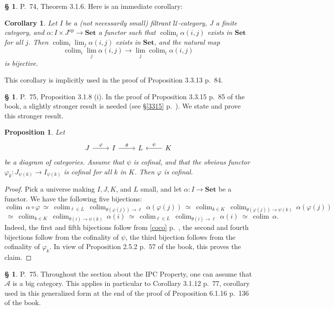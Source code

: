 \documentclass[12pt]{article}
\newtheorem{prop}[thm]{Proposition}
\newtheorem{cor}[thm]{Corollary}
\theoremstyle{remark}
\theoremstyle{definition}
\newtheorem{s}[thm]{\S}
\newcommand{\A}{\mathcal A}
\newcommand{\U}{\mathcal U}
\newcommand{\Set}{\mathbf{Set}}
\newcommand{\pp}{\varphi}
\DeclareMathOperator*{\colim}{colim}
\DeclareMathOperator{\op}{op}
\begin{document}
%

\begin{s} 
P.~74, Theorem 3.1.6. Here is an immediate corollary: 
%
\begin{cor}\label{316}
Let $I$ be a (not necessarily small) filtrant $\U$-category, $J$ a finite category, and $\alpha:I\times J^{\op}\to\Set$ a functor such that $\colim_i\alpha(i,j)$ exists in $\Set$ for all $j$. Then $\colim_i\lim_j\alpha(i,j)$ exists in $\Set$, and the natural map 
$$
\colim_i\lim_j\alpha(i,j)\to
\lim_j\colim_i\alpha(i,j)
$$ 
is bijective. 
\end{cor}
%
This corollary is implicitly used in the proof of Proposition 3.3.13 p.~84.
\end{s}

%

\begin{s} 
P.~75, Proposition 3.1.8 (i). In the proof of Proposition 3.3.15 p.~85 of the book, a slightly stronger result is needed (see \S\ref{3315} p.~\pageref{3315}). We state and prove this stronger result. 
%
\begin{prop}\label{318i} 
%
Let 
$$
\begin{tikzcd}
J\ar{r}{\pp}&I\ar{r}{\theta}&L&K\ar{l}[swap]{\psi}
\end{tikzcd}
$$
be a diagram of categories. Assume that $\psi$ is cofinal, and that the obvious functor $\pp_k:J_{\psi(k)}\to I_{\psi(k)}$ is cofinal for all $k$ in $K$. Then $\pp$ is cofinal. 
%
\end{prop} 
%
\begin{proof}
Pick a universe making $I,J,K$, and $L$ small, and let $\alpha:I\to\Set$ be a functor. We have the following five bijections:
$$
\colim\ \alpha\circ\pp\ \simeq\ 
%
\colim_{\ell\in L}\ \colim_{\theta(\pp(j))\to\ell}\ \alpha(\pp(j))\ \simeq\ 
%
\colim_{k\in K}\ \colim_{\theta(\pp(j))\to\psi(k)}\ \alpha(\pp(j))
$$
$$
\ \simeq\ \colim_{k\in K}\ \colim_{\theta(i)\to\psi(k)}\ \alpha(i)\ \simeq\ 
%
\colim_{\ell\in L}\ \colim_{\theta(i)\to\ell}\ \alpha(i)\ \simeq\ 
%
\colim\ \alpha.
$$
Indeed, the first and fifth bijections follow from \eqref{coco} p.~\pageref{coco}, the second and fourth bijections follow from the cofinality of $\psi$, the third bijection follows from the cofinality of $\pp_k$. In view of Proposition 2.5.2 p.~57 of the book, this proves the claim.
\end{proof}
\end{s}

%

\begin{s}\label{cipc}
P.~75. Throughout the section about the IPC Property, one can assume that $\A$ is a big category. This applies in particular to Corollary 3.1.12 p.~77, corollary used in this generalized form at the end of the proof of Proposition 6.1.16 p.~136 of the book.
\end{s}
\end{document}
